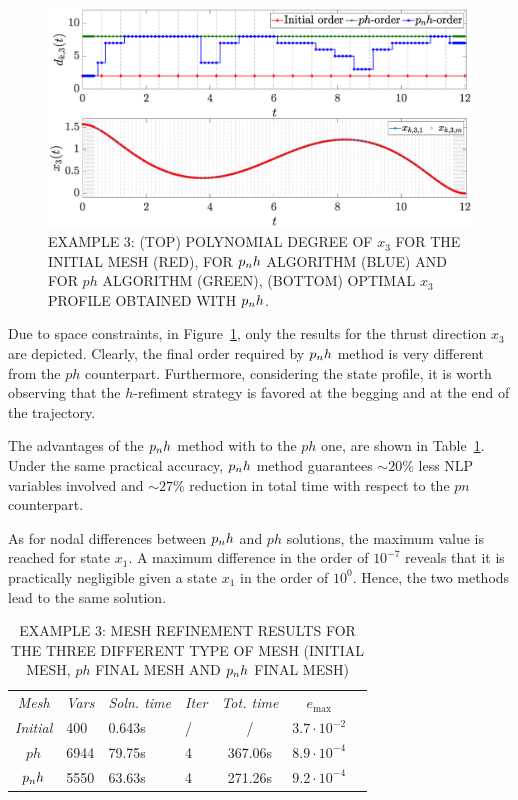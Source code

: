\begin{figure}[t]
	\centering
	\includegraphics[trim={1cm 0.1cm 2cm 1.05cm},clip,width=1.\linewidth]{Img/pnh1_free}
	\caption{EXAMPLE 3: (TOP) POLYNOMIAL DEGREE OF $x_{3}$ FOR THE INITIAL MESH (RED), FOR $p_{n}h$ ALGORITHM (BLUE) AND FOR $ph$ ALGORITHM (GREEN), (BOTTOM) OPTIMAL $x_3$ PROFILE OBTAINED WITH $p_{n}h$.}
	\label{fig:pnh1free}
\end{figure}

Due to space constraints, in Figure~\ref{fig:pnh1free}, only the results for the thrust direction $x_3$ are depicted. Clearly, the final order required by $p_{n}h$ method is very different from the $ph$ counterpart. Furthermore, considering the state profile, it is worth observing that the $h$-refiment strategy is favored at the begging and at the end of the trajectory.

The advantages of the $p_{n}h$ method with to the $ph$ one, are shown in Table~\ref{tab:tablefree}. Under the same practical accuracy, $p_{n}h$ method guarantees $\sim 20\%$ less NLP variables involved and $\sim 27\%$ reduction in total time with respect to the $pn$ counterpart.

As for nodal differences between $p_{n}h$ and $ph$ solutions, the maximum value is reached for state $x_1$. A maximum difference in the order of $10^{-7}$ reveals that it is practically negligible given a state $x_1$ in the order of $10^0$. Hence, the two methods lead to the same solution.
\begin{table}[t]
	\caption{EXAMPLE 3: MESH REFINEMENT RESULTS FOR THE THREE DIFFERENT TYPE OF MESH (INITIAL MESH, $ph$ FINAL MESH AND $p_{n}h$ FINAL MESH)}
	\begin{center}
		\label{tab:tablefree}
		\begin{tabular}{c l l l c c c}
			& & \\ %
			\hline
			\emph{Mesh} & \emph{Vars} & \emph{Soln. time} & \emph{Iter} & \emph{Tot. time} & $e_\text{max}$ \\
			\hline
			\emph{Initial} & 400 & 0.643s & / & / &  $3.7 \cdot 10^{-2}$\\
			$ph$  & 6944 & 79.75s & 4 & 367.06s & $8.9\cdot 10^{-4}$ \\
			$p_{n}h$ & 5550 & 63.63s & 4 & 271.26s & $9.2\cdot 10^{-4}$ \\
			\hline
		\end{tabular}
	\end{center}
\end{table}


